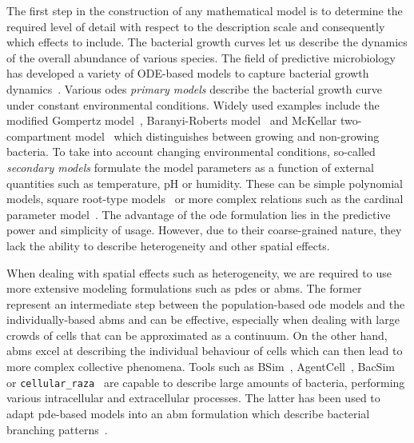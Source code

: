 \documentclass[10pt,twocolumn,5p]{elsarticle}
\numberwithin{equation}{section}
\begin{document}
The first step in the construction of any mathematical model is to determine the required level of
detail with respect to the description scale and consequently which effects to include.
The bacterial growth curves let us describe the dynamics of the overall abundance of various
species.
The field of predictive microbiology has developed a variety of ODE-based models to capture
bacterial growth dynamics~\cite{perez-rodriguez_predictive_2012}.
Various \acp{ode} \textit{primary models} describe the bacterial growth curve under constant
environmental conditions.
Widely used examples include the modified Gompertz model~\cite{Gompertz1825-wi,Gibson1987}, Baranyi-Roberts
model~\cite{baranyi_modeling_1993, baranyi_dynamic_1994} and McKellar two-compartment model~\cite{buchanan_when_1997} which distinguishes between growing and non-growing bacteria.
To take into account changing environmental conditions, so-called \textit{secondary models}
formulate the model parameters as a function of external quantities such as temperature, pH or
humidity.
These can be simple polynomial models, square root-type models~\cite{ratkowsky_relationship_1982} or
more complex relations such as the cardinal parameter model~\cite{zwietering_decision_1992}.
The advantage of the \ac{ode} formulation lies in the predictive power and simplicity of usage.
However, due to their coarse-grained nature, they lack the ability to describe heterogeneity and
other spatial effects.


When dealing with spatial effects such as heterogeneity, we are required to use more extensive
modeling formulations such as \acp{pde} or \acp{abm}.
The former represent an intermediate step between the population-based \ac{ode} models and the
individually-based \acp{abm} and can be effective, especially when dealing with large crowds of
cells that can be approximated as a continuum.
On the other hand, \acp{abm} excel at describing the individual behaviour of cells which can then
lead to more complex collective phenomena.
Tools such as BSim~\cite{Gorochowski2012,Dang2020}, AgentCell~\cite{emonet_agentcell_2005}, BacSim~\cite{kreft_bacsim_1998} or \texttt{cellular\_raza}~\cite{Pleyer2025} are
capable to describe large amounts of bacteria, performing various intracellular and extracellular
processes.
The latter has been used to adapt \ac{pde}-based models into an \ac{abm} formulation which describe
bacterial branching patterns~\cite{Kawasaki1997,Matsushita1998}.
\end{document}
